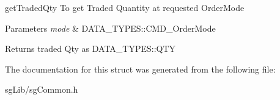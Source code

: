 get\-Traded\-Qty To get Traded Quantity at requested Order\-Mode 


\begin{DoxyParams}{Parameters}
{\em mode} & D\-A\-T\-A\-\_\-\-T\-Y\-P\-E\-S\-::\-C\-M\-D\-\_\-\-Order\-Mode \\
\hline
\end{DoxyParams}
\begin{DoxyReturn}{Returns}
traded Qty as D\-A\-T\-A\-\_\-\-T\-Y\-P\-E\-S\-::\-Q\-T\-Y 
\end{DoxyReturn}


The documentation for this struct was generated from the following file\-:\begin{DoxyCompactItemize}
\item 
sg\-Lib/sg\-Common.\-h\end{DoxyCompactItemize}
